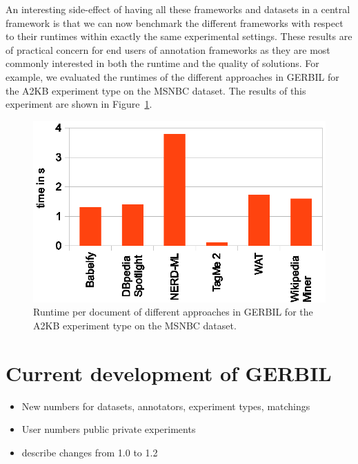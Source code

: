 An interesting side-effect of having all these frameworks and datasets in a central framework is that we can now benchmark the different frameworks with respect to their runtimes within exactly the same experimental settings. These results are of practical concern for end users of annotation frameworks as they are most commonly interested in both the runtime and the quality of solutions. For example, we evaluated the runtimes of the different approaches in GERBIL for the A2KB experiment type on the MSNBC dataset. The results of this experiment are shown in Figure~\ref{fig:runtime}.


\begin{figure}[htb!]
\centering
\includegraphics[scale=1]{part_02/benchmarking/WWW_GERBIL/needed_times.eps}
\caption{Runtime per document of different approaches in GERBIL for the A2KB experiment type on the MSNBC dataset.}
\label{fig:runtime}
\end{figure}

\section{Current development of GERBIL}
\label{sec:currentNumbersForGERBIL}

\begin{itemize}
\item New numbers for datasets, annotators, experiment types, matchings
\item User numbers public private experiments
\item describe changes from 1.0 to 1.2
\end{itemize}
